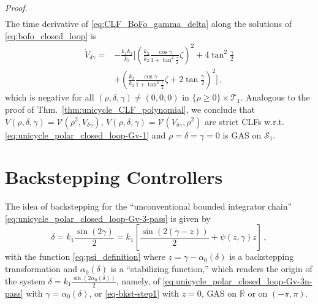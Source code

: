 \documentclass[journal,twoside,web]{ieeecolor}
\theoremstyle{definition}
\renewenvironment{proof}[1][Proof]{\par\pushQED{\qed}\normalfont\textit{#1.}~}{\popQED\par}
\begin{document}
\begin{proof}
\begin{subequations}
\begin{eqnarray}
\end{eqnarray}
\end{subequations}
The time derivative of \eqref{eq:CLF_BoFo_gamma_delta} along the solutions of \eqref{eq:bofo_closed_loop} is
\begin{align}
\dot V_{\delta \gamma}  = &- \frac{k_1k_2}{k_3}\Biggl[
\left(\frac{k_3}{k_2}\frac{\cos\gamma}{{1+\tan^2\frac{\gamma}{2}}} \zeta\right)^2+4\tan^2\frac{\gamma}{2}\nonumber\\
& + \left(\frac{k_3}{k_2}\frac{\cos\gamma}{{1+\tan^2\frac{\gamma}{2}}}\zeta +2\tan\frac{\gamma}{2} \right)^2
\Biggr]\,, \label{eq:V_dot_forward2}
\end{align}
which is negative for all $(\rho,\delta,\gamma) \ne (0,0,0)$ in $\{\rho \ge 0\} \times \mathcal{T}_1$.
Analogous to the proof of Thm.~\ref{thm:unicycle_CLF_polynomial}, we conclude that  $V(\rho, \delta, \gamma) = \mathcal{V}(\rho^2, V_{\delta \gamma})$, $V(\rho, \delta, \gamma) = \mathcal{V}(V_{\delta \gamma},\rho^2)$ are strict CLFs w.r.t. \eqref{eq:unicycle_polar_closed_loop-Gv-1} and  %
$\rho =  \delta = \gamma = 0$ is GAS on $\mathcal{S}_1$.
\end{proof}



\section{Backstepping Controllers}

The idea of backstepping for the ``unconventional bounded integrator chain'' \eqref{eq:unicycle_polar_closed_loop-Gv-3-pass} is given by
\begin{equation}
\label{eq-bkst-step1}
\dot\delta = k_1 \frac{\sin(2\gamma)}{2} =k_1 \left[\frac{\sin(2(\gamma-z))}{2} +\psi(z,\gamma)z\right]\,,
\end{equation}
with the function \eqref{eq:psi_definition} where $z=\gamma - \alpha_0(\delta)$ is a backstepping transformation and $\alpha_0(\delta)$ is a ``stabilizing function,'' which renders the origin of the system $\dot\delta = k_1 \frac{\sin(2\alpha_0(\delta))}{2}$, namely, of  \eqref{eq:unicycle_polar_closed_loop-Gv-3n-pass} with $\gamma=\alpha_0(\delta)$, or \eqref{eq-bkst-step1} with $z=0$, GAS on $\mathbb{R}$ or on $(-\pi,\pi)$.
\end{document}
